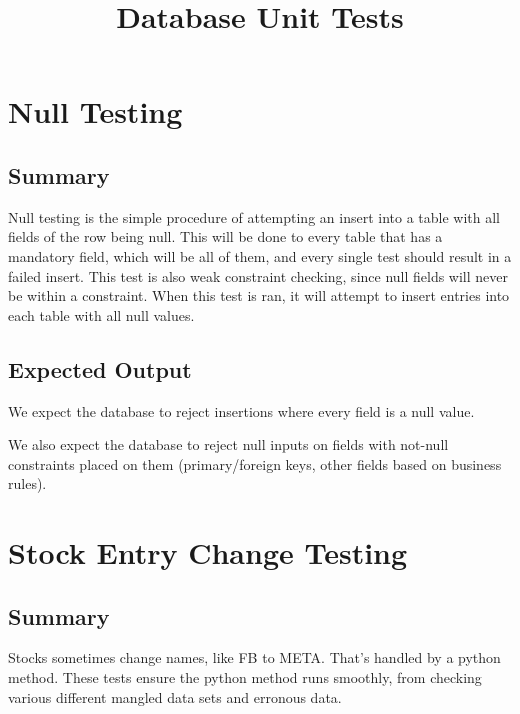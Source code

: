 \documentclass[12pt]{article}
\begin{document}
\renewcommand{\baselinestretch}{1.15} %
\setlength{\parindent}{0pt} %
\setlength{\parskip}{0.8em} %

\title{Database Unit Tests}
\maketitle

\section{Null Testing}

\subsection{Summary}

Null testing is the simple procedure of attempting an insert into a table with all fields of the row being null. This will be done to every table that has a mandatory field, which will be all of them, and every single test should result in a failed insert. This test is also weak constraint checking, since null fields will never be within a constraint. When this test is ran, it will attempt to insert entries into each table with all null values.

\subsection{Expected Output}

We expect the database to reject insertions where every field is a null value.

We also expect the database to reject null inputs on fields with not-null constraints placed on them (primary/foreign keys, other fields based on business rules). 

\section {Stock Entry Change Testing}

\subsection{Summary}

Stocks sometimes change names, like FB to META. That's handled by a python method. These tests ensure the python method runs smoothly, from checking various different mangled data sets and erronous data.
\end{document}
